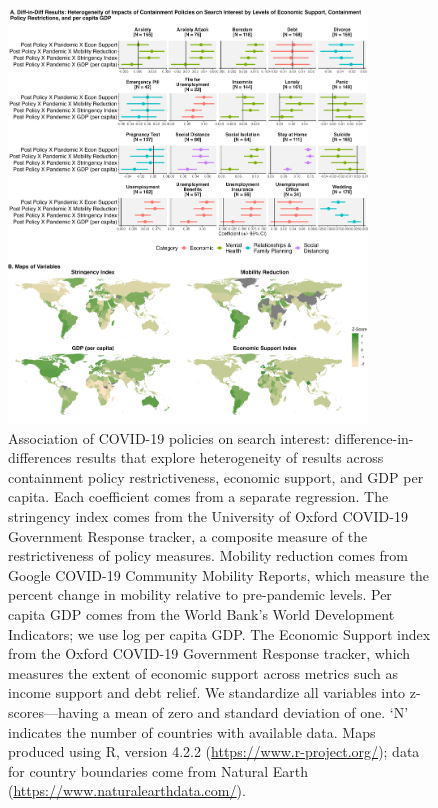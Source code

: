 \documentclass{article}
\begin{document}
\begin{figure}[H]
    \centering
    \includegraphics[width=0.85\textwidth]{figures/did_interact_map_30.png}
    \caption{Association of COVID-19 policies on search interest: difference-in-differences results that explore heterogeneity of results across containment policy restrictiveness, economic support, and GDP per capita. Each coefficient comes from a separate regression. The stringency index comes from the University of Oxford COVID-19 Government Response tracker, a composite measure of the restrictiveness of policy measures. Mobility reduction comes from Google COVID-19 Community Mobility Reports, which measure the percent change in mobility relative to pre-pandemic levels. Per capita GDP comes from the World Bank's World Development Indicators; we use log per capita GDP. The Economic Support index from the Oxford COVID-19 Government Response tracker, which measures the extent of economic support across metrics such as income support and debt relief. We standardize all variables into z-scores---having a mean of zero and standard deviation of one. `N' indicates the number of countries with available data. Maps produced using R, version 4.2.2 (\url{https://www.r-project.org/}); data for country boundaries come from Natural Earth (\url{https://www.naturalearthdata.com/}).}
    \label{fig:did_interact_map_30}
\end{figure}
\end{document}
